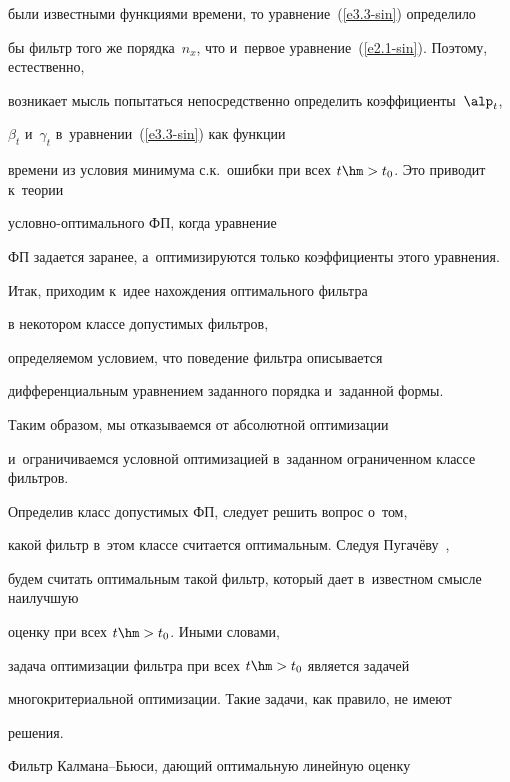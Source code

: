 были известными функциями времени, то уравнение~(\ref{e3.3-sin}) определило


бы фильтр того же  порядка~$n_x$, что и~первое уравнение~(\ref{e2.1-sin}). Поэтому, естественно,


возникает мысль попытаться непосредственно определить коэффициенты~$\alp_t$, 


$\beta_t$ и~$\gamma_t$ в~уравнении~(\ref{e3.3-sin}) как функции


времени из условия минимума с.к.\ ошибки  при всех  $t\hm>t_0$. Это приводит к~теории


услов\-но-оп\-ти\-маль\-но\-го ФП, когда  уравнение


ФП задается заранее, а~оптимизируются только коэффициенты этого урав\-нения.


{





}





Итак, приходим к~идее нахождения оптимального фильтра


в некотором классе допустимых фильт\-ров,


определяемом условием, что поведение фильт\-ра описывается


дифференциальным уравнением заданного порядка и~заданной формы.





Таким образом, мы отказываемся от абсолютной оптимизации 


и~ограничиваемся условной оптимизацией в~заданном ограниченном классе фильтров.


Определив класс допустимых ФП, следует решить вопрос о~том,


какой фильтр в~этом классе считается оптимальным. Следуя Пугачёву~\cite{2-sin}, 


будем считать оптимальным такой фильтр, который дает в~известном смысле наилучшую 


оценку при всех $t\hm>t_0$. Иными словами,


задача оптимизации фильтра при всех $t\hm>t_0$ является  задачей


многокритериальной оптимизации. Такие задачи, как правило, не имеют


решения. 





Фильтр Кал\-ма\-на--Бью\-си, дающий оптимальную линейную оценку


